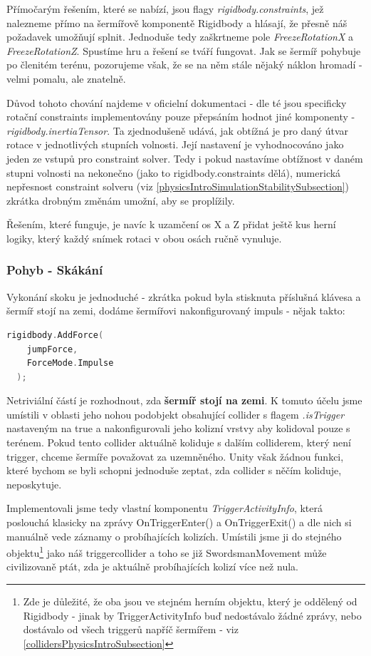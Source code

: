 Přímočarým řešením, které se nabízí, jsou flagy \textit{rigidbody.constraints}, jež nalezneme přímo na šermířově komponentě Rigidbody a hlásají, že přesně náš požadavek umožňují splnit. Jednoduše tedy zaškrtneme pole \textit{FreezeRotationX} a \textit{FreezeRotationZ}. Spustíme hru a řešení se tváří fungovat. Jak se šermíř pohybuje po členitém terénu, pozorujeme však, že se na něm stále nějaký náklon hromadí - velmi pomalu, ale znatelně.

Důvod tohoto chování najdeme v oficielní dokumentaci \cite{Unity} - dle té jsou specificky rotační constraints implementovány pouze přepsáním hodnot jiné komponenty - \textit{rigidbody.inertiaTensor}. Ta zjednodušeně udává, jak obtížná je pro daný útvar rotace v jednotlivých stupních volnosti. Její nastavení je vyhodnocováno jako jeden ze vstupů pro constraint solver. Tedy i pokud nastavíme obtížnost v daném stupni volnosti na nekonečno (jako to rigidbody.constraints dělá), numerická nepřesnost constraint solveru (viz \ref{physicsIntroSimulationStabilitySubsection}) zkrátka drobným změnám umožní, aby se proplížily.

Řešením, které funguje, je navíc k uzamčení os X a Z přidat ještě kus herní logiky, který každý snímek rotaci v obou osách ručně vynuluje.

\subsubsection*{Pohyb - Skákání}

Vykonání skoku je jednoduché - zkrátka pokud byla stisknuta příslušná klávesa a šermíř stojí na zemi, dodáme šermířovi nakonfigurovaný impuls - nějak takto:

\begin{lstlisting}[language=C, basicstyle=\fontsize{11}{13}\selectfont\ttfamily]
  rigidbody.AddForce(
    jumpForce,
    ForceMode.Impulse
  );
\end{lstlisting}

Netriviální částí je rozhodnout, zda \textbf{šermíř stojí na zemi}. K tomuto účelu jsme umístili v oblasti jeho nohou podobjekt obsahující collider s flagem \textit{.isTrigger} nastaveným na true a nakonfigurovali jeho kolizní vrstvy aby kolidoval pouze s terénem. Pokud tento collider aktuálně koliduje s dalším colliderem, který není trigger, chceme šermíře považovat za uzemněného. Unity však žádnou funkci, které bychom se byli schopni jednoduše zeptat, zda collider s něčím koliduje, neposkytuje. 

Implementovali jsme tedy vlastní komponentu \textit{TriggerActivityInfo}, která poslouchá klasicky na zprávy OnTriggerEnter() a OnTriggerExit() a dle nich si manuálně vede záznamy o probíhajících kolizích. Umístili jsme ji do stejného objektu\footnote{Zde je důležité, že oba jsou ve stejném herním objektu, který je oddělený od Rigidbody - jinak by TriggerActivityInfo buď nedostávalo žádné zprávy, nebo dostávalo od všech triggerů napříč šermířem - viz \ref{collidersPhysicsIntroSubsection}} jako náš triggercollider a toho se již SwordsmanMovement může civilizovaně ptát, zda je aktuálně probíhajících kolizí více než nula.

